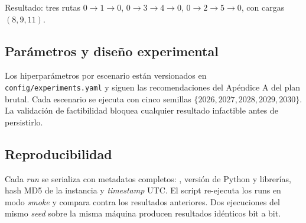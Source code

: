 Resultado: tres rutas $0 \to 1 \to 0$, $0 \to 3 \to 4 \to 0$, $0 \to 2 \to 5 \to 0$, con cargas $(8, 9, 11)$.

\subsection{Parámetros y diseño experimental}

Los hiperparámetros por escenario están versionados en \texttt{config/experiments.yaml} y siguen las recomendaciones del Apéndice A del plan brutal. Cada escenario se ejecuta con cinco semillas $\{2026, 2027, 2028, 2029, 2030\}$. La validación de factibilidad bloquea cualquier resultado infactible antes de persistirlo.

\subsection{Reproducibilidad}

Cada \emph{run} se serializa con metadatos completos: , versión de Python y librerías, hash MD5 de la instancia y \emph{timestamp} UTC. El script  re-ejecuta los runs en modo \emph{smoke} y compara contra los resultados anteriores. Dos ejecuciones del mismo \emph{seed} sobre la misma máquina producen resultados idénticos bit a bit.
